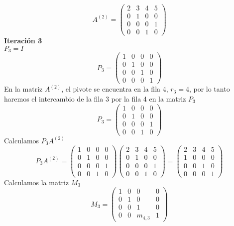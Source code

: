 \[ A^{(2)} =
    \left( \begin{array}{cccc}
    2 & 3 & 4 & 5\\
    0 & 1 & 0 & 0\\
    0 & 0 & 0 & 1\\
    0 & 0 & 1 & 0
    \end{array} \right) 
\]
\textbf{Iteración 3}\\
$P_3 = I$
\[ P_3 =
    \left( \begin{array}{cccc}
    1 & 0 & 0 & 0\\
    0 & 1 & 0 & 0\\ 
    0 & 0 & 1 & 0\\ 
    0 & 0 & 0 & 1
    \end{array} \right) 
\]
En la matriz $A^{(2)}$, el pivote se encuentra en la fila 4, $r_3 = 4$, por lo tanto haremos el intercambio de la fila 3 por la fila 4 en la matriz $P_3$
\[ P_3 =
    \left( \begin{array}{cccc}
    1 & 0 & 0 & 0\\
    0 & 1 & 0 & 0\\ 
    0 & 0 & 0 & 1\\ 
    0 & 0 & 1 & 0
    \end{array} \right) 
\]
Calculamos $P_{3}A^{(2)} $
\[ P_{3}A^{(2)} =
    \left( \begin{array}{cccc}
    1 & 0 & 0 & 0\\
    0 & 1 & 0 & 0\\ 
    0 & 0 & 0 & 1\\ 
    0 & 0 & 1 & 0
    \end{array} \right) \left( \begin{array}{cccc}
    2 & 3 & 4 & 5\\
    0 & 1 & 0 & 0\\
    0 & 0 & 0 & 1\\
    0 & 0 & 1 & 0
    \end{array} \right) =
    \left( \begin{array}{cccc}
    2 & 3 & 4 & 5\\
    1 & 0 & 0 & 0\\ 
    0 & 0 & 1 & 0\\
    0 & 0 & 0 & 1
    \end{array} \right) 
\]
Calculamos la matriz $M_3$
\[ M_3 =
    \left( \begin{array}{cccc}
    1 & 0 & 0 & 0\\
    0 & 1 & 0 & 0\\ 
    0 & 0 & 1 & 0\\ 
    0 & 0 & m_{4,3} & 1
    \end{array} \right) 
\]
